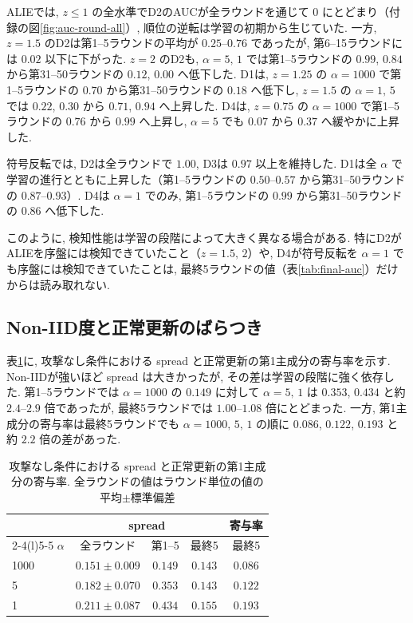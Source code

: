 \documentclass[a4j, twocolumn, dvipdfmx]{jsarticle}
\newcommand{\Spread}{\textrm{spread}}
\begin{document}
ALIEでは, $z \le 1$ の全水準でD2のAUCが全ラウンドを通じて $0$ にとどまり（付録の図\ref{fig:auc-round-all}）, 順位の逆転は学習の初期から生じていた. 一方, $z=1.5$ のD2は第1--5ラウンドの平均が $0.25$--$0.76$ であったが, 第6--15ラウンドには $0.02$ 以下に下がった. $z=2$ のD2も, $\alpha=5,\,1$ では第1--5ラウンドの $0.99$, $0.84$ から第31--50ラウンドの $0.12$, $0.00$ へ低下した. D1は, $z=1.25$ の $\alpha=1000$ で第1--5ラウンドの $0.70$ から第31--50ラウンドの $0.18$ へ低下し, $z=1.5$ の $\alpha=1,\,5$ では $0.22$, $0.30$ から $0.71$, $0.94$ へ上昇した. D4は, $z=0.75$ の $\alpha=1000$ で第1--5ラウンドの $0.76$ から $0.99$ へ上昇し, $\alpha=5$ でも $0.07$ から $0.37$ へ緩やかに上昇した.

符号反転では, D2は全ラウンドで $1.00$, D3は $0.97$ 以上を維持した. D1は全 $\alpha$ で学習の進行とともに上昇した（第1--5ラウンドの $0.50$--$0.57$ から第31--50ラウンドの $0.87$--$0.93$）. D4は $\alpha=1$ でのみ, 第1--5ラウンドの $0.99$ から第31--50ラウンドの $0.86$ へ低下した.

このように, 検知性能は学習の段階によって大きく異なる場合がある. 特にD2がALIEを序盤には検知できていたこと（$z=1.5,\,2$）や, D4が符号反転を $\alpha=1$ でも序盤には検知できていたことは, 最終5ラウンドの値（表\ref{tab:final-auc}）だけからは読み取れない.

\subsection{Non-IID度と正常更新のばらつき}
\label{sec:res-spread}

表\ref{tab:spread}に, 攻撃なし条件における \Spread{} と正常更新の第1主成分の寄与率を示す. Non-IIDが強いほど \Spread{} は大きかったが, その差は学習の段階に強く依存した. 第1--5ラウンドでは $\alpha=1000$ の $0.149$ に対して $\alpha=5,\,1$ は $0.353$, $0.434$ と約 $2.4$--$2.9$ 倍であったが, 最終5ラウンドでは $1.00$--$1.08$ 倍にとどまった. 一方, 第1主成分の寄与率は最終5ラウンドでも $\alpha=1000,\,5,\,1$ の順に $0.086$, $0.122$, $0.193$ と約 $2.2$ 倍の差があった.

\begin{table}[t]
\centering
\caption{攻撃なし条件における \Spread{} と正常更新の第1主成分の寄与率. 全ラウンドの値はラウンド単位の値の平均$\pm$標準偏差}
\label{tab:spread}
\small
\begin{tabular}{@{}lcccc@{}}
\toprule
 & \multicolumn{3}{c}{\Spread{}} & 寄与率 \\
\cmidrule(lr){2-4}\cmidrule(l){5-5}
$\alpha$ & 全ラウンド & 第1--5 & 最終5 & 最終5 \\
\midrule
1000 & $0.151 \pm 0.009$ & $0.149$ & $0.143$ & $0.086$ \\
5    & $0.182 \pm 0.070$ & $0.353$ & $0.143$ & $0.122$ \\
1    & $0.211 \pm 0.087$ & $0.434$ & $0.155$ & $0.193$ \\
\bottomrule
\end{tabular}
\end{table}
\end{document}
